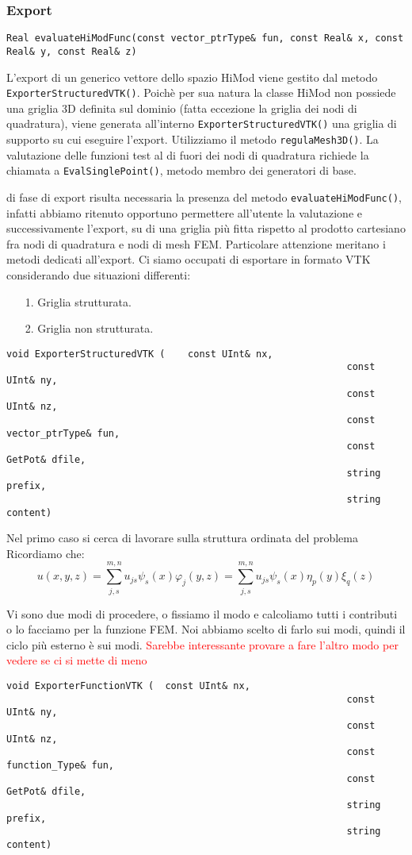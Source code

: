 \subsubsection{Export}

\begin{lstlisting}[style = general, frame = none]
Real evaluateHiModFunc(const vector_ptrType& fun, const Real& x, const Real& y, const Real& z)
\end{lstlisting}

L'export di un generico vettore dello spazio HiMod viene gestito dal metodo \texttt{ExporterStructuredVTK()}. Poich\`e  per sua natura la classe HiMod non possiede una griglia 3D definita sul dominio (fatta eccezione la griglia dei nodi di quadratura), viene generata all'interno \texttt{ExporterStructuredVTK()} una griglia di supporto su cui eseguire l'export. Utilizziamo il metodo \texttt{regulaMesh3D()}. La valutazione delle funzioni test al di fuori dei nodi di quadratura richiede la chiamata a \texttt{EvalSinglePoint()}, metodo membro dei generatori di base.

 di   fase di export risulta necessaria la presenza del metodo \texttt{evaluateHiModFunc()}, infatti abbiamo ritenuto opportuno permettere 
all'utente la valutazione e successivamente l'export, su di una griglia pi\`u fitta rispetto al prodotto cartesiano fra nodi di quadratura e 
nodi di mesh FEM. 
Particolare attenzione meritano i metodi dedicati all'export. Ci siamo occupati di esportare in formato VTK considerando due situazioni 
differenti:
\begin{itemize}
\item[1.] Griglia strutturata.
\item[2.] Griglia non strutturata.
\end{itemize}
\begin{lstlisting}[style = general]
void ExporterStructuredVTK (	const UInt& nx,
															const UInt& ny,
															const UInt& nz,
															const vector_ptrType& fun,
															const GetPot& dfile, 
															string prefix,
															string content)
\end{lstlisting}
Nel primo caso si cerca di lavorare sulla struttura ordinata del problema
Ricordiamo che:
\begin{equation}
u(x,y,z) = \sum_{j,s}^{m,n}u_{js}\psi_s(x)\varphi_j(y,z) = \sum_{j,s}^{m,n}u_{js}\psi_s(x)\eta_p(y)\xi_q(z)
\end{equation}

Vi sono due modi di procedere, o fissiamo il modo e calcoliamo tutti i contributi o lo facciamo per la funzione FEM.
Noi abbiamo scelto di farlo sui modi, quindi il ciclo pi\`u esterno \`e sui modi.
\textcolor{red}{Sarebbe interessante provare a fare l'altro modo per vedere se ci si mette di meno}

\begin{lstlisting}[style = general]
void ExporterFunctionVTK (	const UInt& nx,
															const UInt& ny,
															const UInt& nz,
															const function_Type& fun,
															const GetPot& dfile, 
															string prefix,
															string content)
\end{lstlisting}

